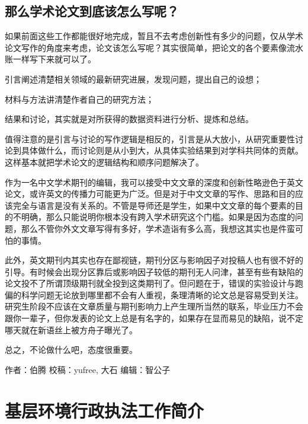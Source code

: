\documentclass[
]{book}
\begin{document}
\hypertarget{ux90a3ux4e48ux5b66ux672fux8bbaux6587ux5230ux5e95ux8be5ux600eux4e48ux5199ux5462}{%
\subsection{那么学术论文到底该怎么写呢？}\label{ux90a3ux4e48ux5b66ux672fux8bbaux6587ux5230ux5e95ux8be5ux600eux4e48ux5199ux5462}}

如果前面这些工作都能很好地完成，暂且不去考虑创新性有多少的问题，仅从学术论文写作的角度来考虑，论文该怎么写呢？其实很简单，把论文的各个要素像流水账一样写下来就可以了。

引言阐述清楚相关领域的最新研究进展，发现问题，提出自己的设想；

材料与方法讲清楚作者自己的研究方法；

结果和讨论，其实就是对所获得的数据资料进行分析、提炼和总结。

值得注意的是引言与讨论的写作逻辑是相反的，引言是从大放小，从研究重要性讨论到具体做什么，而讨论则是从小到大，从具体实验结果到对学科共同体的贡献。这样基本就把学术论文的逻辑结构和顺序问题解决了。

作为一名中文学术期刊的编辑，我可以接受中文文章的深度和创新性略逊色于英文论文，或许英文的传播力可能更为广泛。但是对于中文文章的写作、思路和目的应该完全与语言是没有关系的。不管是导师还是学生，如果中文文章的每个要素的目的不明确，那么只能说明你根本没有跨入学术研究这个门槛。如果是因为态度的问题，那么不管你外文文章写得有多好，学术造诣有多么高，我想这其实也是件蛮可怕的事情。

此外，英文期刊内其实也存在鄙视链，期刊分区与影响因子对投稿人也有很不好的引导。有时候会出现分区靠后或影响因子较低的期刊无人问津，甚至有些有缺陷的论文投不了所谓顶级期刊就全投到这类期刊了。但问题在于，错误的实验设计与跑偏的科学问题无论放到哪里都不会有人重视，条理清晰的论文总是容易受到关注。研究生阶段不应该在文章质量与期刊影响力上产生理所当然的联系，毕业压力不会跟你一辈子，但你发表的论文上总是有名字的，如果存在显而易见的缺陷，说不定哪天就在新语丝上被方舟子曝光了。

总之，不论做什么吧，态度很重要。

作者：伯腾
校稿：yufree, 大石
编辑：智公子

\hypertarget{ux57faux5c42ux73afux5883ux884cux653fux6267ux6cd5ux5de5ux4f5cux7b80ux4ecb}{%
\section{基层环境行政执法工作简介}\label{ux57faux5c42ux73afux5883ux884cux653fux6267ux6cd5ux5de5ux4f5cux7b80ux4ecb}}
\end{document}
